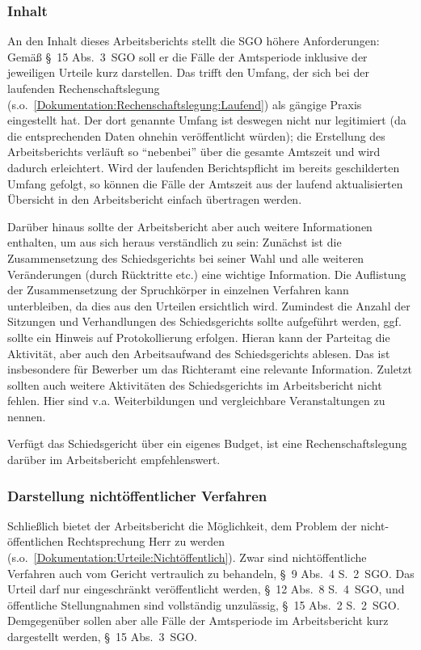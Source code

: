 \subsubsection{Inhalt}
\label{Dokumentation:Rechenschaftslegung:Arbeitsbericht:Inhalt}
An den Inhalt dieses Arbeitsberichts stellt die SGO höhere Anforderungen:
Gemäß \S~15 Abs.~3~SGO soll er die Fälle der Amtsperiode inklusive der jeweiligen Urteile kurz darstellen.
Das trifft den Umfang, der sich bei der laufenden Rechenschaftslegung (s.o.~\ref{Dokumentation:Rechenschaftslegung:Laufend}) als gängige Praxis eingestellt hat.
Der dort genannte Umfang ist deswegen nicht nur legitimiert (da die entsprechenden Daten ohnehin veröffentlicht würden); die Erstellung des Arbeitsberichts verläuft so \enquote{nebenbei} über die gesamte Amtszeit und wird dadurch erleichtert.
Wird der laufenden Berichtspflicht im bereits geschilderten Umfang gefolgt, so können die Fälle der Amtszeit aus der laufend aktualisierten Übersicht in den Arbeitsbericht einfach übertragen werden.

Darüber hinaus sollte der Arbeitsbericht aber auch weitere Informationen enthalten, um aus sich heraus verständlich zu sein:
Zunächst ist die Zusammensetzung des Schiedsgerichts bei seiner Wahl und alle weiteren Veränderungen (durch Rücktritte etc.) eine wichtige Information.
Die Auflistung der Zusammensetzung der Spruchkörper in einzelnen Verfahren kann unterbleiben, da dies aus den Urteilen ersichtlich wird.
Zumindest die Anzahl der Sitzungen und Verhandlungen des Schiedsgerichts sollte aufgeführt werden, ggf. sollte ein Hinweis auf Protokollierung erfolgen.
Hieran kann der Parteitag die Aktivität, aber auch den Arbeitsaufwand des Schiedsgerichts ablesen.
Das ist insbesondere für Bewerber um das Richteramt eine relevante Information.
Zuletzt sollten auch weitere Aktivitäten des Schiedsgerichts im Arbeitsbericht nicht fehlen.
Hier sind v.a. Weiterbildungen und vergleichbare Veranstaltungen zu nennen.

Verfügt das Schiedsgericht über ein eigenes Budget, ist eine Rechenschaftslegung darüber im Arbeitsbericht empfehlenswert.

\subsubsection{Darstellung nichtöffentlicher Verfahren}
\label{Dokumentation:Rechenschaftslegung:Arbeitsbericht:nichtöffentlicheVerfahren}
Schließlich bietet der Arbeitsbericht die Möglichkeit, dem Problem der nicht-öffentlichen Rechtsprechung Herr zu werden (s.o.~\ref{Dokumentation:Urteile:Nichtöffentlich}).
Zwar sind nichtöffentliche Verfahren auch vom Gericht vertraulich zu behandeln, \S~9 Abs.~4 S.~2~SGO.
Das Urteil darf nur eingeschränkt veröffentlicht werden, \S~12 Abs.~8 S.~4~SGO, und öffentliche Stellungnahmen sind vollständig unzulässig, \S~15 Abs.~2 S.~2~SGO.
Demgegenüber sollen aber alle Fälle der Amtsperiode im Arbeitsbericht kurz dargestellt werden, \S~15 Abs.~3~SGO.

